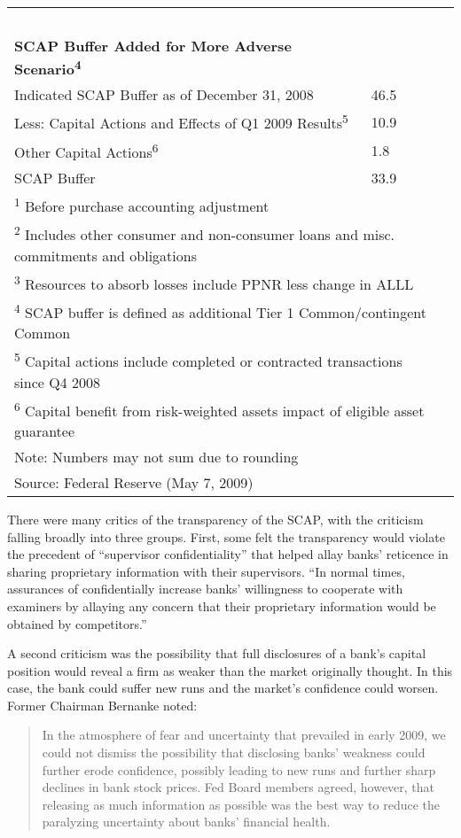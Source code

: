 \documentclass[justified, nobib]{tufte-handout2}
\begin{document}
\begin{table}[htbp]
\begin{longtable}[l]{@{\extracolsep{\fill}}@{}ll@{}rl@{}}
~ & ~ & ~\tabularnewline
\textbf{SCAP Buffer Added for More Adverse Scenario\textsuperscript{4}} & ~ & ~\tabularnewline
Indicated SCAP Buffer as of December 31, 2008 & 46.5 & ~\tabularnewline
\hspace{1em} Less: Capital Actions and Effects of Q1 2009 Results\textsuperscript{5}& 10.9 & ~\tabularnewline
\hspace{2em} Other Capital Actions\textsuperscript{6}& 1.8 & ~\tabularnewline
SCAP Buffer & 33.9 &~\tabularnewline
\bottomrule
\multicolumn{3}{l}{\footnotesize\textsuperscript{1} Before purchase accounting adjustment }\tabularnewline
\multicolumn{3}{l}{\footnotesize\textsuperscript{2} Includes other consumer and non-consumer loans and misc. commitments and obligations}\tabularnewline
\multicolumn{3}{l}{\footnotesize\textsuperscript{3} Resources to absorb losses include PPNR less change in ALLL}\tabularnewline
\multicolumn{3}{l}{\footnotesize\textsuperscript{4} SCAP buffer is defined as additional Tier 1 Common/contingent Common}\tabularnewline
\multicolumn{3}{l}{\footnotesize\textsuperscript{5} Capital actions include completed or contracted transactions since Q4 2008}\tabularnewline
\multicolumn{3}{l}{\footnotesize\textsuperscript{6} Capital benefit from risk-weighted assets impact of eligible asset guarantee}\tabularnewline
\multicolumn{3}{l}{\footnotesize Note: Numbers may not sum due to rounding}\tabularnewline
\multicolumn{3}{l}{\footnotesize Source: Federal Reserve (May 7, 2009)}\tabularnewline
\end{longtable}

\end{table}

There were many critics of the transparency of the SCAP, with the criticism
falling broadly into three groups. First, some felt the transparency would
violate the precedent of ``supervisor confidentiality'' that helped allay
banks' reticence in sharing proprietary information with their
supervisors. ``In normal times, assurances of confidentially increase
banks' willingness to cooperate with examiners by allaying any concern
that their proprietary information would be obtained by competitors.''\citep{Bernanke}

A second criticism was the possibility that full disclosures of a bank's
capital position would reveal a firm as weaker than the market
originally thought. In this case, the bank could suffer new runs and the
market's confidence could worsen. Former Chairman Bernanke noted:

\begin{quote}
In the atmosphere of fear and uncertainty that prevailed in early 2009,
we could not dismiss the possibility that disclosing banks' weakness
could further erode confidence, possibly leading to new runs and further
sharp declines in bank stock prices. Fed Board members agreed, however,
that releasing as much information as possible was the best way to
reduce the paralyzing uncertainty about banks' financial health.
\citep{Bernanke}
\end{quote}
\end{document}
